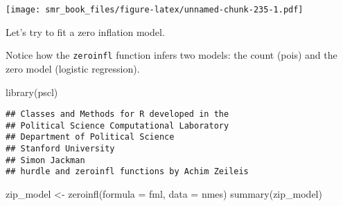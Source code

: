 \documentclass[
  oneside]{book}
\newenvironment{Shaded}{\begin{snugshade}}{\end{snugshade}}
\newcommand{\AttributeTok}[1]{\textcolor[rgb]{0.77,0.63,0.00}{#1}}
\newcommand{\FunctionTok}[1]{\textcolor[rgb]{0.00,0.00,0.00}{#1}}
\newcommand{\NormalTok}[1]{#1}
\newcommand{\OtherTok}[1]{\textcolor[rgb]{0.56,0.35,0.01}{#1}}
\begin{document}
\texttt{[image: smr\_book\_files/figure-latex/unnamed-chunk-235-1.pdf]}

Let's try to fit a zero inflation model.

Notice how the \texttt{zeroinfl} function infers two models:
the count (pois) and the zero model (logistic regression).

\begin{Shaded}
\begin{Highlighting}[]
\FunctionTok{library}\NormalTok{(pscl)}
\end{Highlighting}
\end{Shaded}

\begin{verbatim}
## Classes and Methods for R developed in the
## Political Science Computational Laboratory
## Department of Political Science
## Stanford University
## Simon Jackman
## hurdle and zeroinfl functions by Achim Zeileis
\end{verbatim}

\begin{Shaded}
\begin{Highlighting}[]
\NormalTok{zip\_model }\OtherTok{\textless{}{-}} \FunctionTok{zeroinfl}\NormalTok{(}\AttributeTok{formula =}\NormalTok{ fml, }\AttributeTok{data =}\NormalTok{ nmes)}
\FunctionTok{summary}\NormalTok{(zip\_model)}
\end{Highlighting}
\end{Shaded}
\end{document}
